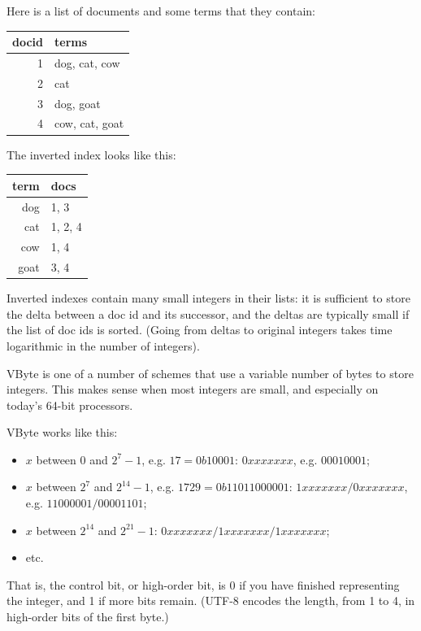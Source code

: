 \documentclass[a4paper]{report}
\begin{document}
Here is a list of documents and some terms that they contain:
\begin{center}
\begin{tabular}{r|l}
docid & terms \\ \hline
1 & dog, cat, cow\\
2 & cat\\
3 & dog, goat\\
4 & cow, cat, goat\\
\end{tabular}
\end{center}

The inverted index looks like this:
\begin{center}
\begin{tabular}{r|l}
term & docs \\ \hline
dog & 1, 3 \\
cat & 1, 2, 4 \\
cow & 1, 4 \\
goat & 3, 4
\end{tabular}
\end{center}

Inverted indexes contain many small integers in their lists: it is
sufficient to store the delta between a doc id and its successor, and
the deltas are typically small if the list of doc ids is sorted.
(Going from deltas to original integers takes time logarithmic
in the number of integers).

VByte is one of a number of schemes that use a variable number of
bytes to store integers.  This makes sense when most integers are
small, and especially on today's 64-bit processors.

VByte works like this:
\vspace*{-1em}
\begin{itemize}[noitemsep]
\item $x$ between 0 and $2^7-1$, e.g. $17 = 0b10001$: $0xxx xxxx$, e.g. $0001 0001$;
\item $x$ between $2^7$ and $2^{14}-1$, e.g. $1729 = 0b110 11000001$:
                   $1xxx xxxx/0xxx xxxx$, e.g. $1100 0001/0000 1101$;
\item $x$ between $2^{14}$ and $2^{21}-1$: $0xxx xxxx/1xxx xxxx/1xxx xxxx$;
\item etc.
\end{itemize}
That is, the control bit, or high-order bit, is 0 if you have finished representing the integer,
and 1 if more bits remain. (UTF-8 encodes the length, from 1 to 4, in high-order bits of the first byte.)
\end{document}
